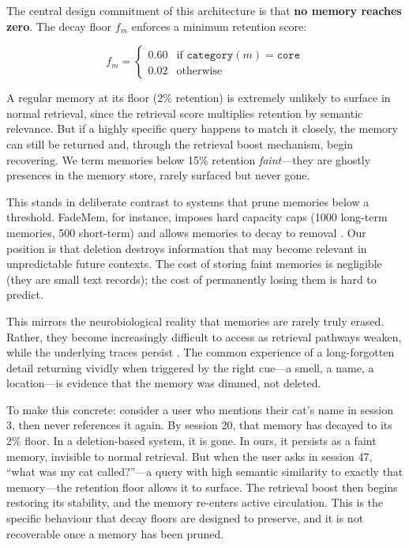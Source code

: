 \documentclass[11pt,a4paper]{article}
\begin{document}
The central design commitment of this architecture is that \textbf{no memory reaches zero}. The decay floor $f_m$ enforces a minimum retention score:

\begin{equation}
f_m = \begin{cases}
0.60 & \text{if } \texttt{category}(m) = \texttt{core} \\
0.02 & \text{otherwise}
\end{cases}
\end{equation}

A regular memory at its floor (2\% retention) is extremely unlikely to surface in normal retrieval, since the retrieval score multiplies retention by semantic relevance. But if a highly specific query happens to match it closely, the memory can still be returned and, through the retrieval boost mechanism, begin recovering. We term memories below 15\% retention \emph{faint}---they are ghostly presences in the memory store, rarely surfaced but never gone.

This stands in deliberate contrast to systems that prune memories below a threshold. FadeMem, for instance, imposes hard capacity caps (1000 long-term memories, 500 short-term) and allows memories to decay to removal \citep{wei2026fademem}. Our position is that deletion destroys information that may become relevant in unpredictable future contexts. The cost of storing faint memories is negligible (they are small text records); the cost of permanently losing them is hard to predict.

This mirrors the neurobiological reality that memories are rarely truly erased. Rather, they become increasingly difficult to access as retrieval pathways weaken, while the underlying traces persist \citep{wixted2004psychology}. The common experience of a long-forgotten detail returning vividly when triggered by the right cue---a smell, a name, a location---is evidence that the memory was dimmed, not deleted.

To make this concrete: consider a user who mentions their cat's name in session 3, then never references it again. By session 20, that memory has decayed to its 2\% floor. In a deletion-based system, it is gone. In ours, it persists as a faint memory, invisible to normal retrieval. But when the user asks in session 47, ``what was my cat called?''---a query with high semantic similarity to exactly that memory---the retention floor allows it to surface. The retrieval boost then begins restoring its stability, and the memory re-enters active circulation. This is the specific behaviour that decay floors are designed to preserve, and it is not recoverable once a memory has been pruned.
\end{document}
